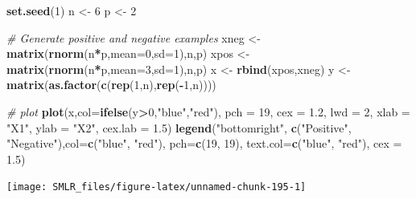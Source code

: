 \documentclass[
]{book}
\newenvironment{Shaded}{\begin{snugshade}}{\end{snugshade}}
\newcommand{\AttributeTok}[1]{\textcolor[rgb]{0.13,0.29,0.53}{#1}}
\newcommand{\CommentTok}[1]{\textcolor[rgb]{0.56,0.35,0.01}{\textit{#1}}}
\newcommand{\DecValTok}[1]{\textcolor[rgb]{0.00,0.00,0.81}{#1}}
\newcommand{\FloatTok}[1]{\textcolor[rgb]{0.00,0.00,0.81}{#1}}
\newcommand{\FunctionTok}[1]{\textcolor[rgb]{0.13,0.29,0.53}{\textbf{#1}}}
\newcommand{\NormalTok}[1]{#1}
\newcommand{\OtherTok}[1]{\textcolor[rgb]{0.56,0.35,0.01}{#1}}
\newcommand{\SpecialCharTok}[1]{\textcolor[rgb]{0.81,0.36,0.00}{\textbf{#1}}}
\newcommand{\StringTok}[1]{\textcolor[rgb]{0.31,0.60,0.02}{#1}}
\theoremstyle{definition}
\theoremstyle{definition}
\theoremstyle{definition}
\theoremstyle{definition}
\theoremstyle{remark}
\begin{document}
\begin{Shaded}
\begin{Highlighting}[]
    \FunctionTok{set.seed}\NormalTok{(}\DecValTok{1}\NormalTok{)}
\NormalTok{    n }\OtherTok{\textless{}{-}} \DecValTok{6}
\NormalTok{    p }\OtherTok{\textless{}{-}} \DecValTok{2}
    
    \CommentTok{\# Generate positive and negative examples}
\NormalTok{    xneg }\OtherTok{\textless{}{-}} \FunctionTok{matrix}\NormalTok{(}\FunctionTok{rnorm}\NormalTok{(n}\SpecialCharTok{*}\NormalTok{p,}\AttributeTok{mean=}\DecValTok{0}\NormalTok{,}\AttributeTok{sd=}\DecValTok{1}\NormalTok{),n,p)}
\NormalTok{    xpos }\OtherTok{\textless{}{-}} \FunctionTok{matrix}\NormalTok{(}\FunctionTok{rnorm}\NormalTok{(n}\SpecialCharTok{*}\NormalTok{p,}\AttributeTok{mean=}\DecValTok{3}\NormalTok{,}\AttributeTok{sd=}\DecValTok{1}\NormalTok{),n,p)}
\NormalTok{    x }\OtherTok{\textless{}{-}} \FunctionTok{rbind}\NormalTok{(xpos,xneg)}
\NormalTok{    y }\OtherTok{\textless{}{-}} \FunctionTok{matrix}\NormalTok{(}\FunctionTok{as.factor}\NormalTok{(}\FunctionTok{c}\NormalTok{(}\FunctionTok{rep}\NormalTok{(}\DecValTok{1}\NormalTok{,n),}\FunctionTok{rep}\NormalTok{(}\SpecialCharTok{{-}}\DecValTok{1}\NormalTok{,n))))}
    
    \CommentTok{\# plot }
    \FunctionTok{plot}\NormalTok{(x,}\AttributeTok{col=}\FunctionTok{ifelse}\NormalTok{(y}\SpecialCharTok{\textgreater{}}\DecValTok{0}\NormalTok{,}\StringTok{"blue"}\NormalTok{,}\StringTok{"red"}\NormalTok{), }\AttributeTok{pch =} \DecValTok{19}\NormalTok{, }\AttributeTok{cex =} \FloatTok{1.2}\NormalTok{, }\AttributeTok{lwd =} \DecValTok{2}\NormalTok{, }
         \AttributeTok{xlab =} \StringTok{"X1"}\NormalTok{, }\AttributeTok{ylab =} \StringTok{"X2"}\NormalTok{, }\AttributeTok{cex.lab =} \FloatTok{1.5}\NormalTok{)}
    \FunctionTok{legend}\NormalTok{(}\StringTok{"bottomright"}\NormalTok{, }\FunctionTok{c}\NormalTok{(}\StringTok{"Positive"}\NormalTok{, }\StringTok{"Negative"}\NormalTok{),}\AttributeTok{col=}\FunctionTok{c}\NormalTok{(}\StringTok{"blue"}\NormalTok{, }\StringTok{"red"}\NormalTok{),}
           \AttributeTok{pch=}\FunctionTok{c}\NormalTok{(}\DecValTok{19}\NormalTok{, }\DecValTok{19}\NormalTok{), }\AttributeTok{text.col=}\FunctionTok{c}\NormalTok{(}\StringTok{"blue"}\NormalTok{, }\StringTok{"red"}\NormalTok{), }\AttributeTok{cex =} \FloatTok{1.5}\NormalTok{)}
\end{Highlighting}
\end{Shaded}

\begin{center}\texttt{[image: SMLR\_files/figure-latex/unnamed-chunk-195-1]} \end{center}
\end{document}
